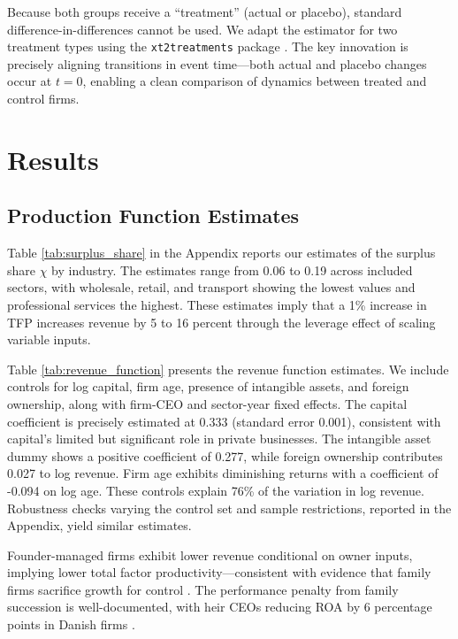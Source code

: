 \documentclass[11pt,a4paper]{article}
\begin{document}
Because both groups receive a ``treatment'' (actual or placebo), standard difference-in-differences cannot be used. We adapt the \citet{Callaway2021JoLE} estimator for two treatment types using the \texttt{xt2treatments} package \citep{Koren2024xt2treatments}. The key innovation is precisely aligning transitions in event time—both actual and placebo changes occur at $t=0$, enabling a clean comparison of dynamics between treated and control firms.


\section{Results}

\subsection{Production Function Estimates}

Table \ref{tab:surplus_share} in the Appendix reports our estimates of the surplus share $\chi$ by industry. The estimates range from 0.06 to 0.19 across included sectors, with wholesale, retail, and transport showing the lowest values and professional services the highest. These estimates imply that a 1\% increase in TFP increases revenue by 5 to 16 percent through the leverage effect of scaling variable inputs.

Table \ref{tab:revenue_function} presents the revenue function estimates. We include controls for log capital, firm age, presence of intangible assets, and foreign ownership, along with firm-CEO and sector-year fixed effects. The capital coefficient is precisely estimated at 0.333 (standard error 0.001), consistent with capital's limited but significant role in private businesses. The intangible asset dummy shows a positive coefficient of 0.277, while foreign ownership contributes 0.027 to log revenue. Firm age exhibits diminishing returns with a coefficient of -0.094 on log age. These controls explain 76\% of the variation in log revenue. Robustness checks varying the control set and sample restrictions, reported in the Appendix, yield similar estimates.

Founder-managed firms exhibit lower revenue conditional on owner inputs, implying lower total factor productivity—consistent with evidence that family firms sacrifice growth for control \citep{bennedsen2007inside}. The performance penalty from family succession is well-documented, with heir CEOs reducing ROA by 6 percentage points in Danish firms \citep{bennedsen2007family}. 
\end{document}
